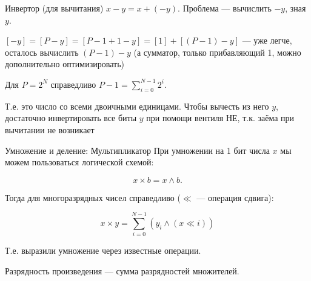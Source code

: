 \documentclass[xetex,aspectratio=43]{beamer}
\begin{document}
\begin{frame}{Инвертор (для вычитания)}
    \(x-y = x+(-y)\). Проблема --- вычислить \(-y\), зная \(y\).

    \([-y] = [P-y] = [P-1+1 - y] = [1] + [(P-1) - y]\) --- уже легче,
    осталось вычислить \((P-1) - y\) (а сумматор, только прибавляющий 1,
    можно дополнительно оптимизировать)

    Для \(P = 2^N\) справедливо \(P-1 = \displaystyle\sum_{i=0}^{N-1}2^i\).

    Т.е. это число со всеми двоичными единицами. Чтобы вычесть из него
    \(y\), достаточно инвертировать все биты \(y\) при помощи вентиля НЕ,
    т.к. заёма при вычитании не возникает
\end{frame}

\begin{frame}{Умножение и деление: Мультипликатор}
    При умножении на 1 бит числа \(x\) мы можем пользоваться логической
    схемой:

    \[x\times b = x \land b.\]

    Тогда для многоразрядных чисел справедливо (\(\ll\) --- операция
    сдвига):

    \[x \times y = \sum_{i=0}^{N-1} (y_i \land (x\ll i))\]

    Т.е. выразили умножение через известные операции.

    Разрядность произведения --- сумма разрядностей множителей.
\end{frame}
\end{document}
